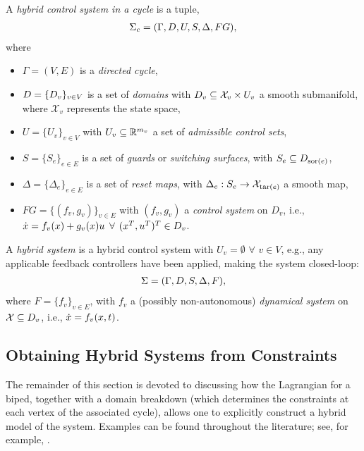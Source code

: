 \begin{definition} A {\em hybrid control system in a cycle} is a tuple,
  \begin{align}
    \Sigma_{c} = (\Gamma, D, U, S, \Delta, FG),
  \end{align}
  where
  \begin{itemize}
  \item $\Gamma = (V,E)$ is a {\em directed cycle},
  \item $D = \{D_{v}\}_{v \in V}$ is a set of {\em domains} with $D_{v}
    \subseteq \mathcal{X}_{v} \times U_v$ a smooth submanifold, where
    $\mathcal{X}_{v}$ represents the state space,
  \item $U = \{U_{v}\}_{v \in V}$ with $U_{v} \subseteq \mathbb{R}^{m_{v}}$ a set of
    {\em admissible control sets},
  \item $S = \{S_{e}\}_{e \in E}$ is a set of {\em guards} or {\em switching
      surfaces}, with $S_{e} \subseteq D_{\mathrm{sor}(e)}$,
  \item $\Delta = \{\Delta_{e}\}_{e \in E}$ is a set of {\em reset maps}, with
    $\Delta_{e} : S_{e} \to \mathcal{X}_{\mathrm{tar}(e)}$ a smooth map,
  \item $FG = \{(f_{v}, g_{v})\}_{v \in E}$ with $(f_v,g_v)$ a {\em control
      system} on $D_{v}$, i.e., $\dot{x} = f_{v}(x) + g_{v}(x) u$ $\forall$
    $(x^{T}, u^{T})^{T} \in D_{v}$.
  \end{itemize}
\end{definition}

\begin{definition}
  A {\em hybrid system} is a hybrid control system with $U_v = \emptyset$
  $\forall$ $v \in V$, e.g., any applicable feedback controllers have been
  applied, making the system closed-loop:
  \begin{align}
    \Sigma = (\Gamma, D, S, \Delta, F),
  \end{align}
  where $F = \{f_{v}\}_{v \in E}$, with $f_{v}$ a (possibly non-autonomous) {\em
    dynamical system} on $\mathcal{X} \subseteq D_{v}$, i.e., ${\dot {x}} =
  f_{v}(x,t)$.
\end{definition}

\subsection{Obtaining Hybrid Systems from Constraints}
The remainder of this section is devoted to discussing how the Lagrangian for a
biped, together with a domain breakdown (which determines the constraints at
each vertex of the associated cycle), allows one to explicitly construct a
hybrid model of the system.
%
Examples can be found throughout the literature; see, for example,
\cite{Grizzle2010, Grizzle2014, Sinnet2009}.


